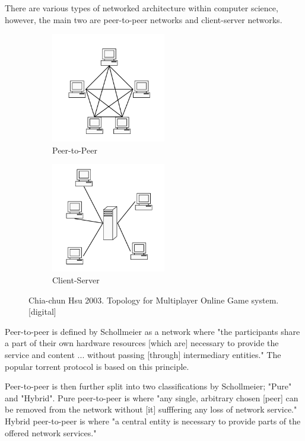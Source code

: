 \documentclass{article}
\begin{document}
There are various types of networked architecture within computer science, however, the main two are peer-to-peer networks and client-server networks.
\begin{figure}[!h]
    \centering
    \begin{subfigure}[b]{5cm}
        \centering
        \includegraphics[width=5cm]{peer-to-peer.png}
        \caption{Peer-to-Peer}
    \end{subfigure}
    \begin{subfigure}[b]{5cm}
        \centering
        \includegraphics[width=5cm]{client-server.png}
        \caption{Client-Server}
    \end{subfigure}
    \caption{Chia-chun Hsu 2003. Topology for Multiplayer Online Game system. [digital]}
\end{figure}

Peer-to-peer is defined by Schollmeier\cite{schollmeier2001} as a network where "the participants share a part of their own hardware resources [which are] necessary to provide the service and content ... without passing [through] intermediary entities." The popular torrent protocol is based on this principle.

Peer-to-peer is then further split into two classifications by Schollmeier; "Pure" and "Hybrid". Pure peer-to-peer is where "any single, arbitrary chosen [peer] can be removed from the network without [it] sufffering any loss of network service." Hybrid peer-to-peer is where "a central entity is necessary to provide parts of the offered network services."
\end{document}
